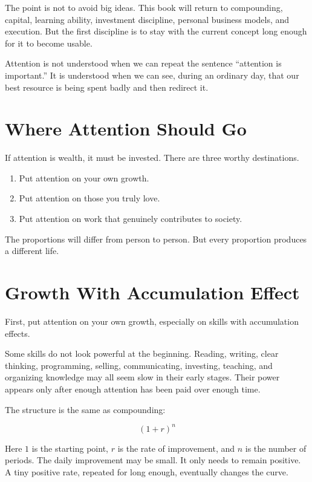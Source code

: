 The point is not to avoid big ideas. This book will return to compounding, capital, learning ability, investment discipline, personal business models, and execution. But the first discipline is to stay with the current concept long enough for it to become usable.

Attention is not understood when we can repeat the sentence ``attention is important.'' It is understood when we can see, during an ordinary day, that our best resource is being spent badly and then redirect it.

\section*{Where Attention Should Go}

If attention is wealth, it must be invested. There are three worthy destinations.

\begin{enumerate}
\item Put attention on your own growth.
\item Put attention on those you truly love.
\item Put attention on work that genuinely contributes to society.
\end{enumerate}

The proportions will differ from person to person. But every proportion produces a different life.

\section*{Growth With Accumulation Effect}

First, put attention on your own growth, especially on skills with accumulation effects.

Some skills do not look powerful at the beginning. Reading, writing, clear thinking, programming, selling, communicating, investing, teaching, and organizing knowledge may all seem slow in their early stages. Their power appears only after enough attention has been paid over enough time.

The structure is the same as compounding:

\[
(1+r)^n
\]

Here \(1\) is the starting point, \(r\) is the rate of improvement, and \(n\) is the number of periods. The daily improvement may be small. It only needs to remain positive. A tiny positive rate, repeated for long enough, eventually changes the curve.


